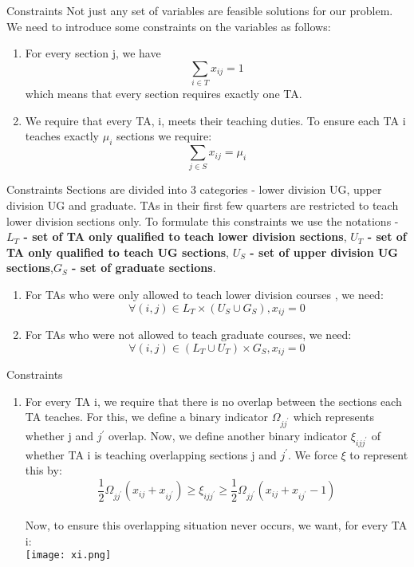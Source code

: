 \documentclass[9pt]{beamer}
\newcounter{savedenum}
\newcommand*{\saveenum}{\setcounter{savedenum}{\theenumi}}
\newcommand*{\resume}{\setcounter{enumi}{\thesavedenum}}
\begin{document}
\begin{frame}{Constraints}
Not just any set of variables are feasible solutions for our problem. We need to introduce some constraints on the variables as follows:
\pause
\begin{enumerate}
    \item For every section j, we have\\
$$
\sum_{i \in T} x_{i j}=1
$$
which means that every section requires exactly one TA.
\pause
\item We require that every TA, i, meets their teaching duties. To ensure each TA i teaches exactly $ \mu_i $ sections we require:\\
$$
\sum_{j \in S} x_{i j}=\mu_{i}
$$
\saveenum
\end{enumerate}
\end{frame} 

\begin{frame}{Constraints}
Sections are divided into 3 categories - lower division UG, upper division UG and graduate. TAs in their first few quarters are restricted to teach lower division sections only. To formulate this constraints we use the notations - \textbf{$ L_T $ - set of TA only qualified to teach lower division sections}, \textbf{$ U_T $ - set of TA only qualified to teach UG sections}, \textbf{$ U_S $ - set of upper division UG sections},\textbf{$ G_S $ - set of graduate sections}.
\vspace{0.1cm}
\pause
\begin{enumerate}
\resume
\item For TAs who were only allowed to teach lower division courses , we need:\\
    $$
\forall(i, j) \in L_{T} \times\left(U_{S} \cup G_{S}\right), x_{i j}=0
$$
\pause
\item For TAs who were not allowed to teach graduate courses, we need:\\
$$
\forall(i, j) \in\left(L_{T} \cup U_{T}\right) \times G_{S}, x_{i j}=0
$$
\end{enumerate}
\saveenum
\end{frame}

\begin{frame}{Constraints}
\begin{enumerate}
\resume
\item For every TA i, we require that there is no overlap between the sections each TA teaches. For this, we define a binary indicator $ \Omega_{jj^'} $ which represents whether j and $ j^' $ overlap. Now, we define another binary indicator $ \xi_{ijj^'} $ of whether TA i is teaching overlapping sections j and $ j^' $. We force $ \xi $ to represent this by:\\
$$
\frac{1}{2} \Omega_{j j^{\prime}}\left(x_{i j}+x_{i j^{\prime}}\right) \geq \xi_{i j j^{\prime}} \geq \frac{1}{2} \Omega_{j j^{\prime}}\left(x_{i j}+x_{i j^{\prime}}-1\right)
$$\\
Now, to ensure this overlapping situation never occurs, we want, for every TA i:\\
\centering
\texttt{[image: xi.png]}
\end{enumerate}
\end{frame} 
\end{document}
